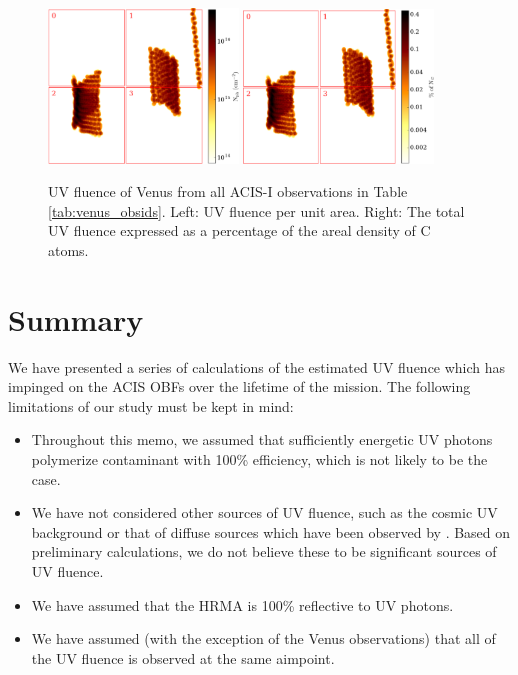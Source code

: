 \documentclass[11pt]{article}
\begin{document}
\begin{figure}
\begin{center}
\includegraphics[width=0.45\textwidth]{venus_all_fluence.eps}
\includegraphics[width=0.45\textwidth]{venus_all_fluence_percent.eps}
\caption{UV fluence of Venus from all ACIS-I observations in Table \ref{tab:venus_obsids}. Left: UV fluence per unit area.
Right: The total UV fluence expressed as a percentage of the areal density of C atoms.\label{fig:total_venus_fluence}}
\end{center}
\end{figure}

\section{Summary}

We have presented a series of calculations of the estimated UV fluence which has impinged on the ACIS OBFs
over the lifetime of the mission. The following limitations of our study must be kept in mind:

\begin{itemize}
\item Throughout this memo, we assumed that sufficiently energetic UV photons polymerize contaminant with 100\%
efficiency, which is not likely to be the case.
\item We have not considered other sources of UV fluence, such as the cosmic UV background or that of diffuse
sources which have been observed by \chandra. Based on preliminary calculations, we do not believe these to be
significant sources of UV fluence.
\item We have assumed that the HRMA is 100\% reflective to UV photons.
\item We have assumed (with the exception of the Venus observations) that all of the UV fluence is observed at the
same aimpoint.
\end{itemize}
\end{document}
